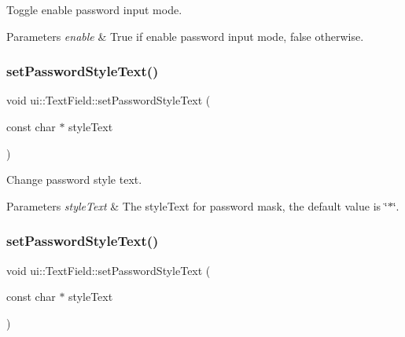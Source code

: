 Toggle enable password input mode. 


\begin{DoxyParams}{Parameters}
{\em enable} & True if enable password input mode, false otherwise. \\
\hline
\end{DoxyParams}
\mbox{\label{classui_1_1TextField_a787ba67bbd76be259b96b0a44407038a}} 
\subsubsection{\texorpdfstring{set\+Password\+Style\+Text()}{setPasswordStyleText()}\hspace{0.1cm}{\footnotesize\ttfamily [1/2]}}
{\footnotesize\ttfamily void ui\+::\+Text\+Field\+::set\+Password\+Style\+Text (\begin{DoxyParamCaption}\item[{const char $\ast$}]{style\+Text }\end{DoxyParamCaption})}



Change password style text. 


\begin{DoxyParams}{Parameters}
{\em style\+Text} & The style\+Text for password mask, the default value is \char`\"{}$\ast$\char`\"{}. \\
\hline
\end{DoxyParams}
\mbox{\label{classui_1_1TextField_a787ba67bbd76be259b96b0a44407038a}} 
\subsubsection{\texorpdfstring{set\+Password\+Style\+Text()}{setPasswordStyleText()}\hspace{0.1cm}{\footnotesize\ttfamily [2/2]}}
{\footnotesize\ttfamily void ui\+::\+Text\+Field\+::set\+Password\+Style\+Text (\begin{DoxyParamCaption}\item[{const char $\ast$}]{style\+Text }\end{DoxyParamCaption})}



